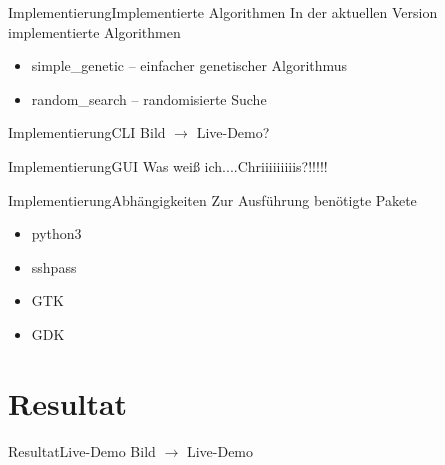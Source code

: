 \documentclass[ngerman,10pt,xcolor=colortbl,compress
]{beamer}
\begin{document}
	\begin{frame}{Implementierung}{Implementierte Algorithmen}
	In der aktuellen Version implementierte Algorithmen
	\begin{itemize}
		\item simple\_genetic -- einfacher genetischer Algorithmus
		\item random\_search -- randomisierte Suche
	\end{itemize}
	\end{frame}
	
	\begin{frame}{Implementierung}{CLI}
	Bild $\rightarrow$ Live-Demo?
	\end{frame}

	\begin{frame}{Implementierung}{GUI}
	Was weiß ich....Chriiiiiiiiis?!!!!!
	\end{frame}
	
	\begin{frame}{Implementierung}{Abhängigkeiten}
		Zur Ausführung benötigte Pakete
		\begin{itemize}
			\item python3
			\item sshpass
			\item GTK
			\item GDK
		\end{itemize}
	\end{frame}
	
	\section{Resultat}
	\begin{frame}{Resultat}{Live-Demo}
	Bild $\rightarrow$ Live-Demo
	\end{frame}
	
\end{document}
